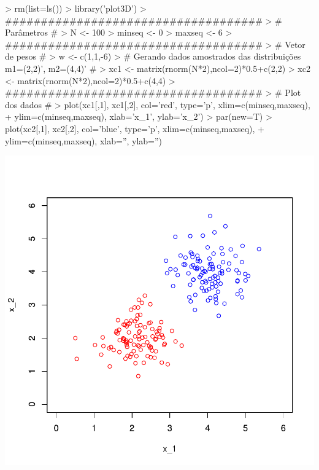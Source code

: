 \documentclass{article}
\begin{document}
\begin{Schunk}
\begin{Sinput}
> rm(list=ls())
> library('plot3D')
> ####################################
> # Parâmetros #
> N <- 100
> minseq <- 0
> maxseq <- 6
> ####################################
> # Vetor de pesos #
> w <- c(1,1,-6)
> # Gerando dados amostrados das distribuições m1=(2,2)', m2=(4,4)' #
> xc1 <- matrix(rnorm(N*2),ncol=2)*0.5+c(2,2)
> xc2 <- matrix(rnorm(N*2),ncol=2)*0.5+c(4,4)
> ####################################
> # Plot dos dados #
> plot(xc1[,1], xc1[,2], col='red', type='p', xlim=c(minseq,maxseq), 
+      ylim=c(minseq,maxseq), xlab='x_1', ylab='x_2')
> par(new=T)
> plot(xc2[,1], xc2[,2], col='blue', type='p', xlim=c(minseq,maxseq), 
+      ylim=c(minseq,maxseq), xlab='', ylab='')
\end{Sinput}
\end{Schunk}
\includegraphics{perceptron-001}
\end{document}
